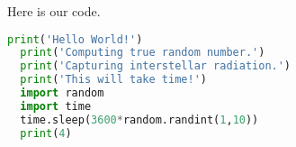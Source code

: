 Here is our code.

\begin{lstlisting}[language=python, showstringspaces=false,frame=single]
  print('Hello World!')
  print('Computing true random number.')
  print('Capturing interstellar radiation.')
  print('This will take time!')
  import random
  import time
  time.sleep(3600*random.randint(1,10))
  print(4)
\end{lstlisting}


